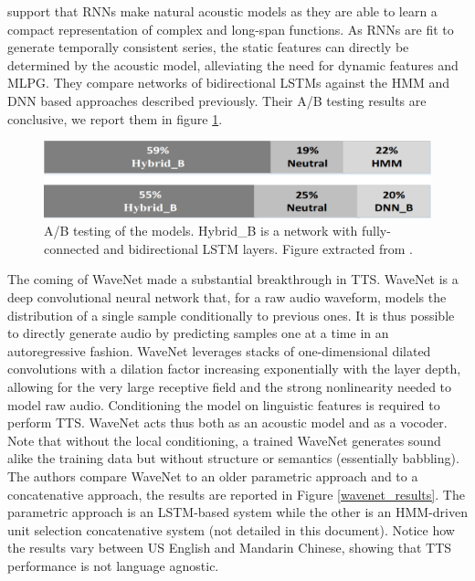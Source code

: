 \documentclass[a4paper, oneside, 12pt, english]{article}
\begin{document}
\citep{BDLSTMTTS} support that RNNs make natural acoustic models as they are able to learn a compact representation of complex and long-span functions. As RNNs are fit to generate temporally consistent series, the static features can directly be determined by the acoustic model, alleviating the need for dynamic features and MLPG. They compare networks of bidirectional LSTMs against the HMM and DNN based approaches described previously. Their A/B testing results are conclusive, we report them in figure \ref{dblstm_subjective}.

\begin{figure}[h]
	\centering
	\includegraphics[width=0.6\linewidth]{images/bdlstm_subjective.png}
	\caption{A/B testing of the models. Hybrid\_B is a network with fully-connected and bidirectional LSTM layers. Figure extracted from \citep{BDLSTMTTS}.}
	\label{dblstm_subjective}
\end{figure}

The coming of WaveNet \citep{WaveNet} made a substantial breakthrough in TTS. WaveNet is a deep convolutional neural network that, for a raw audio waveform, models the distribution of a single sample conditionally to previous ones. It is thus possible to directly generate audio by predicting samples one at a time in an autoregressive fashion. WaveNet leverages stacks of one-dimensional dilated convolutions with a dilation factor increasing exponentially with the layer depth, allowing for the very large receptive field and the strong nonlinearity needed to model raw audio. Conditioning the model on linguistic features is required to perform TTS. WaveNet acts thus both as an acoustic model and as a vocoder. Note that without the local conditioning, a trained WaveNet generates sound alike the training data but without structure or semantics (essentially babbling). 
The authors compare WaveNet to an older parametric approach and to a concatenative approach, the results are reported in Figure \ref{wavenet_results}. The parametric approach is an LSTM-based system while the other is an HMM-driven unit selection concatenative system (not detailed in this document). Notice how the results vary between US English and Mandarin Chinese, showing that TTS performance is not language agnostic.
\end{document}
